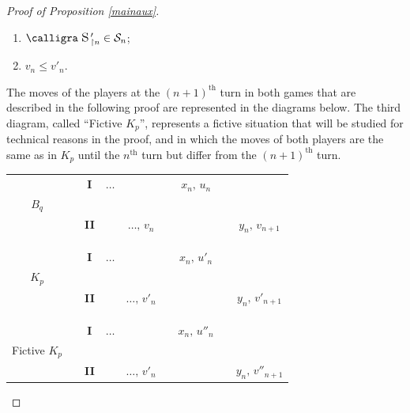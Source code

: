 \documentclass[a4paper,11pt]{article}
\theoremstyle{definition}
\numberwithin{equation}{section}
\newcommand{\St}{\mathcal{S}}
\newcommand{\st}{\text{{\calligra \LARGE s}}\,}
\begin{document}
\begin{proof}[Proof of Proposition \ref{mainaux}]
\begin{enumerate}

\item[(a)] $\st'_{\restriction n} \in \St_n$;

\item[(b)] $v_n \leqslant v'_n$.

\end{enumerate}

The moves of the players at the $(n+1)^\text{th}$ turn in both games that are described in the following proof are represented in the diagrams below. The third diagram, called ``Fictive $K_p$'', represents a fictive situation that will be studied for technical reasons in the proof, and in which the moves of both players are the same as in $K_p$ until the $n^\text{th}$ turn but differ from the $(n + 1)^\text{th}$ turn.

\bigskip

\begin{tabular}{ccccccccc}
& & \textbf{I} & $\hdots$ & & & $x_n, \, u_n$ & &  \\
$B_q$ & & & & & & \\
& & \textbf{II} & & $\hdots, \, v_n$ & & & & $y_n,  \, v_{n + 1}$ \\
\\
\\
\\
& & \textbf{I} & $\hdots$ & & & $x_n, \, u'_n$ & &  \\
$K_p$ & & & & & & \\
& & \textbf{II} & & $\hdots, \, v'_n$ & & & & $y_n,  \, v'_{n + 1}$ \\
\\
\\
\\
& & \textbf{I} & $\hdots$ & & & $x_n, \, u''_n$ & &  \\
Fictive $K_p$ & & & & & & \\
& & \textbf{II} & & $\hdots, \, v'_n$ & & & & $y_n,  \, v''_{n + 1}$
\end{tabular}

\bigskip


\end{proof}
\end{document}
